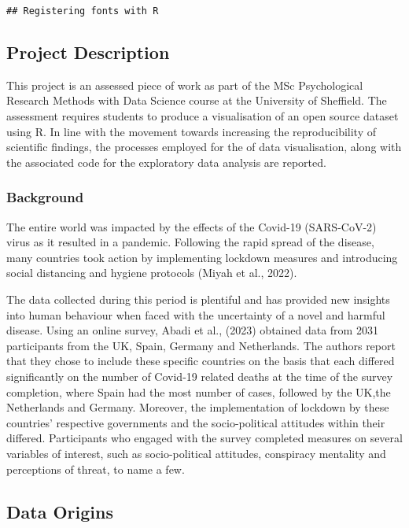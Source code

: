 \documentclass[
]{article}
\begin{document}
\begin{verbatim}
## Registering fonts with R
\end{verbatim}

\subsection{Project Description}\label{project-description}

This project is an assessed piece of work as part of the MSc
Psychological Research Methods with Data Science course at the
University of Sheffield. The assessment requires students to produce a
visualisation of an open source dataset using R. In line with the
movement towards increasing the reproducibility of scientific findings,
the processes employed for the of data visualisation, along with the
associated code for the exploratory data analysis are reported.

\subsubsection{Background}\label{background}

The entire world was impacted by the effects of the Covid-19
(SARS-CoV-2) virus as it resulted in a pandemic. Following the rapid
spread of the disease, many countries took action by implementing
lockdown measures and introducing social distancing and hygiene
protocols (Miyah et al., 2022).

The data collected during this period is plentiful and has provided new
insights into human behaviour when faced with the uncertainty of a novel
and harmful disease. Using an online survey, Abadi et al., (2023)
obtained data from 2031 participants from the UK, Spain, Germany and
Netherlands. The authors report that they chose to include these
specific countries on the basis that each differed significantly on the
number of Covid-19 related deaths at the time of the survey completion,
where Spain had the most number of cases, followed by the UK,the
Netherlands and Germany. Moreover, the implementation of lockdown by
these countries' respective governments and the socio-political
attitudes within their differed. Participants who engaged with the
survey completed measures on several variables of interest, such as
socio-political attitudes, conspiracy mentality and perceptions of
threat, to name a few.

\subsection{Data Origins}\label{data-origins}
\end{document}

